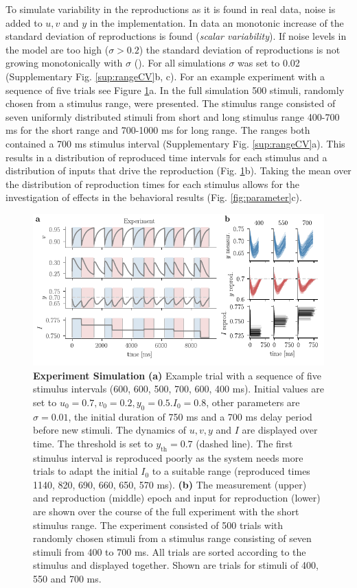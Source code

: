 \documentclass[10pt]{article}
\begin{document}
To simulate variability in the reproductions as it is found in real data, noise is added to $u, v$ and $y$ in the implementation. In data an monotonic increase of the standard deviation of reproductions is found (\textit{scalar variability}). 
If noise levels in the model are too high ($\sigma>0.2$) the standard deviation of reproductions is not growing monotonically with $\sigma$ (\cite{Egger2020}).
For all simulations $\sigma$ was set to 0.02 (Supplementary Fig. \ref{sup:rangeCV}b, c).
For an example experiment with a sequence of five trials see Figure \ref{fig:experiment}a. 
In the full simulation 500 stimuli, randomly chosen from a stimulus range, were presented. 
The stimulus range consisted of seven uniformly distributed stimuli from short and long stimulus range 400-700 ms for the short range and 700-1000 ms for long range. The ranges both contained a 700 ms stimulus interval (Supplementary Fig. \ref{sup:rangeCV}a).
This results in a distribution of reproduced time intervals for each stimulus and a distribution of inputs that drive the reproduction (Fig. \ref{fig:experiment}b).
Taking the mean over the distribution of reproduction times for each stimulus allows for the investigation of effects in the behavioral results (Fig. \ref{fig:parameter}c). 

\begin{figure}[ht]
	\centering
	\includegraphics{figures/trial.pdf}
	\caption{\textbf{Experiment Simulation} 
	\textbf{(a)} Example trial with a sequence of five stimulus intervals (600, 600, 500, 700, 600, 400 ms). Initial values are set to $u_0=0.7 , v_0=0.2 , y_0=0.5. I_0=0.8$, other parameters are $\sigma=0.01$, the initial duration of 750 ms and a 700 ms delay period before new stimuli. The dynamics of $u, v, y $ and $I$ are displayed over time. The threshold is set to $y_{\text{th}}=0.7$ (dashed line). The first stimulus interval is reproduced poorly as the system needs more trials to adapt the initial $I_0$ to a suitable range (reproduced times 1140, 820, 690, 660, 650, 570 ms).
	\textbf{(b)} The measurement (upper) and reproduction (middle) epoch and input for reproduction (lower) are shown over the course of the full experiment with the short stimulus range. The experiment consisted of 500 trials with randomly chosen stimuli from a stimulus range consisting of seven stimuli from 400 to 700 ms. All trials are sorted according to the stimulus and displayed together. Shown are trials for stimuli of 400, 550 and 700 ms.}
\label{fig:experiment}
\end{figure}
\end{document}
